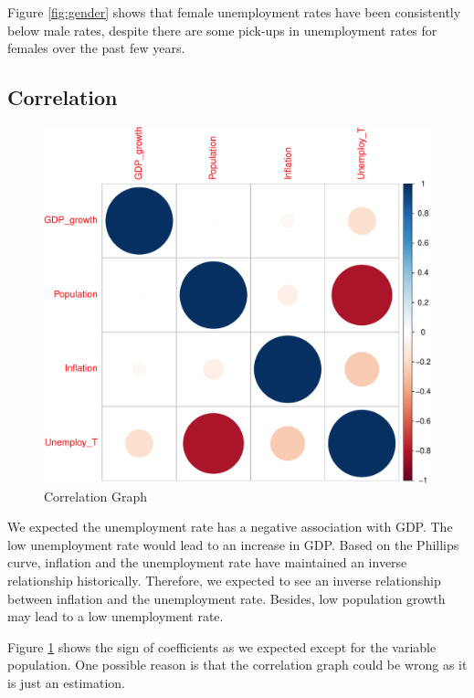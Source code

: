\documentclass[11pt,a4paper,]{article}
\begin{document}
Figure \ref{fig:gender} shows that female unemployment rates have been consistently below male rates, despite there are some pick-ups in unemployment rates for females over the past few years.

\subsection{Correlation}

\begin{figure}[H]

{\centering \includegraphics{Figures/cor-1} 

}

\caption{Correlation Graph}\label{fig:cor}
\end{figure}

We expected the unemployment rate has a negative association with GDP. The low unemployment rate would lead to an increase in GDP. Based on the Phillips curve, inflation and the unemployment rate have maintained an inverse relationship historically. Therefore, we expected to see an inverse relationship between inflation and the unemployment rate. Besides, low population growth may lead to a low unemployment rate.

Figure \ref{fig:cor} shows the sign of coefficients as we expected except for the variable population. One possible reason is that the correlation graph could be wrong as it is just an estimation.
\end{document}
